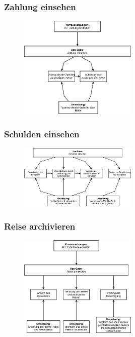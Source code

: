 \subsubsection{Zahlung einsehen}

	\begin{figure}[H]
		\centering
		\includegraphics[width=0.5\textwidth]{img/diagrams/Anforderung-Zahlung_einsehen}
	\end{figure}

\subsubsection{Schulden einsehen}

	\begin{figure}[H]
		\centering
		\includegraphics[width=0.5\textwidth]{img/diagrams/Anforderung-Schulden_einsehen}
	\end{figure}

\subsubsection{Reise archivieren}

	\begin{figure}[H]
		\centering
		\includegraphics[width=0.5\textwidth]{img/diagrams/Anforderung-Reise_archivieren}
	\end{figure}

